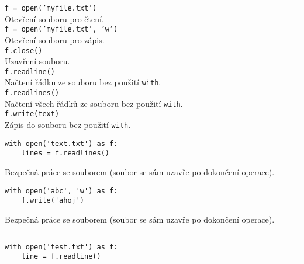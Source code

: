 \documentclass[12pt,a4paper]{article}
\begin{document}
\pagestyle{empty}

\setlength\parindent{0pt}
\setlength{\columnsep}{60pt}
\begin{multicols}{2}

\Large

\texttt{f = open('myfile.txt')}\\

Otevření souboru pro čtení.\\

\texttt{f = open('myfile.txt', 'w')}\\

Otevření souboru pro zápis.\\

\texttt{f.close()}\\

Uzavření souboru.\\

\texttt{f.readline()}\\

Načtení řádku ze souboru bez použití \texttt{with}.\\

\texttt{f.readlines()}\\

Načtení všech řádků ze souboru bez použití \texttt{with}.\\

\texttt{f.write(text)}\\

Zápis do souboru bez použití \texttt{with}.

\begin{verbatim}
with open('text.txt') as f:
    lines = f.readlines()
\end{verbatim}

Bezpečná práce se souborem (soubor se sám uzavře po dokončení operace).

\begin{verbatim}
with open('abc', 'w') as f:
    f.write('ahoj')
\end{verbatim}

Bezpečná práce se souborem (soubor se sám uzavře po dokončení operace).\\

\rule{\linewidth}{1pt}

\begin{verbatim}
with open('test.txt') as f:
    line = f.readline()
\end{verbatim}

\end{multicols}
\end{document}
